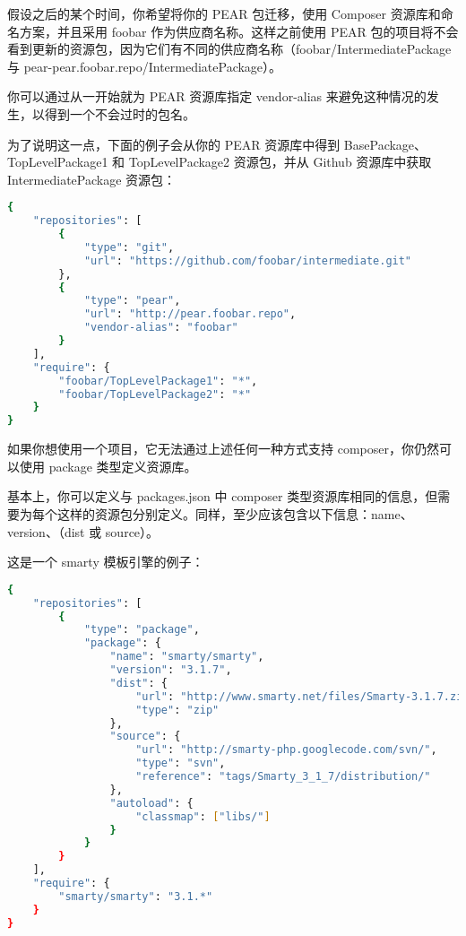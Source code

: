 假设之后的某个时间，你希望将你的 PEAR 包迁移，使用 Composer 资源库和命名方案，并且采用 foobar 作为供应商名称。这样之前使用 PEAR 包的项目将不会看到更新的资源包，因为它们有不同的供应商名称（foobar/IntermediatePackage 与 pear-pear.foobar.repo/IntermediatePackage）。

你可以通过从一开始就为 PEAR 资源库指定 vendor-alias 来避免这种情况的发生，以得到一个不会过时的包名。

为了说明这一点，下面的例子会从你的 PEAR 资源库中得到 BasePackage、TopLevelPackage1 和 TopLevelPackage2 资源包，并从 Github 资源库中获取 IntermediatePackage 资源包：



\begin{lstlisting}[language=bash]
{
    "repositories": [
        {
            "type": "git",
            "url": "https://github.com/foobar/intermediate.git"
        },
        {
            "type": "pear",
            "url": "http://pear.foobar.repo",
            "vendor-alias": "foobar"
        }
    ],
    "require": {
        "foobar/TopLevelPackage1": "*",
        "foobar/TopLevelPackage2": "*"
    }
}
\end{lstlisting}

如果你想使用一个项目，它无法通过上述任何一种方式支持 composer，你仍然可以使用 package 类型定义资源库。

基本上，你可以定义与 packages.json 中 composer 类型资源库相同的信息，但需要为每个这样的资源包分别定义。同样，至少应该包含以下信息：name、version、（dist 或 source）。

这是一个 smarty 模板引擎的例子：



\begin{lstlisting}[language=bash]
{
    "repositories": [
        {
            "type": "package",
            "package": {
                "name": "smarty/smarty",
                "version": "3.1.7",
                "dist": {
                    "url": "http://www.smarty.net/files/Smarty-3.1.7.zip",
                    "type": "zip"
                },
                "source": {
                    "url": "http://smarty-php.googlecode.com/svn/",
                    "type": "svn",
                    "reference": "tags/Smarty_3_1_7/distribution/"
                },
                "autoload": {
                    "classmap": ["libs/"]
                }
            }
        }
    ],
    "require": {
        "smarty/smarty": "3.1.*"
    }
}
\end{lstlisting}



